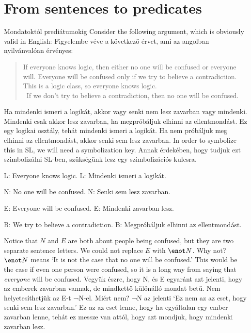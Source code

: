 \section{From sentences to predicates}
Mondatoktól prediátumokig
Consider the following argument, which is obviously valid in English:
Figyelembe véve a következő érvet, ami az angolban nyilvánvalóan érvényes:
\begin{quote}
If everyone knows logic, then either no one will be confused or everyone will. Everyone will be confused only if we try to believe a contradiction. This is a logic class, so everyone knows logic.\\
\therefore\ If we don't try to believe a contradiction, then no one will be confused.
\end{quote}
Ha mindenki ismeri a logikát, akkor vagy senki nem lesz zavarban vagy mindenki. Mindenki csak akkor lesz zavarban, ha megpróbáljuk elhinni az ellentmondást. Ez egy logikai osztály, tehát mindenki ismeri a logikát. Ha nem próbáljuk meg elhinni az ellentmondást, akkor senki sem lesz zavarban.
In order to symbolize this in SL, we will need a symbolization key.
Annak érdekében, hogy tudjuk ezt szimbolizálni SL-ben, szükségünk lesz egy szimbolizációs kulcsra.
\begin{ekey}
\item[L:] Everyone knows logic.
L: Mindenki ismeri a logikát.
\item[N:] No one will be confused.
N: Senki sem lesz zavarban.
\item[E:] Everyone will be confused.
E: Mindenki zavarban lesz.
\item[B:] We try to believe a contradiction.
B: Megpróbáljuk elhinni az ellentmondást.
\end{ekey}
Notice that $N$ and $E$ are both about people being confused, but they are two separate sentence letters. We could not replace $E$ with $\enot N$. Why not? $\enot N$ means `It is not the case that no one will be confused.' This would be the case if even one person were confused, so it is a long way from saying that \emph{everyone} will be confused.
Vegyük észre, hogy N, és E egyaránt azt jelenti, hogy az emberek zavarban vannak, de mindkettő különálló mondat betű. Nem helyetesíthetjük az E-t ¬N-el.  Miért nem?  ¬N az jelenti  ‘Ez nem az az eset, hogy senki sem lesz zavarban.’ Ez az az eset lenne, hogy ha egyáltalan egy ember zavarban lenne, tehát ez messze van attól, hogy azt mondjuk, hogy mindenki zavarban lesz.


